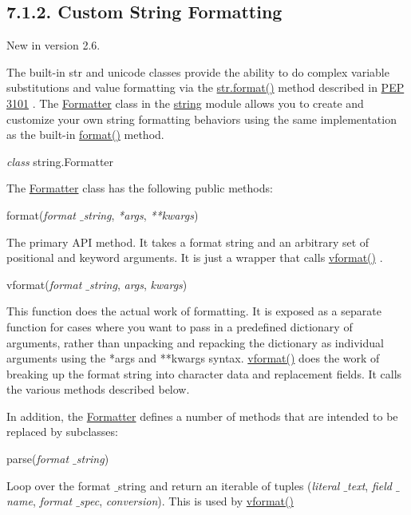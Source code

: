 \documentclass[a4paper,12pt]{report}
\begin{document}
\subsection*{7.1.2. Custom String Formatting}
 \par
\noindent 
New in version 2.6. \par
\noindent 
The built-in str and unicode classes provide the ability to do complex variable substitutions and value formatting via the \href{https://docs.python.org/2/library/stdtypes.html}{str.format()}
 method described in \href{https://www.python.org/dev/peps/pep-3101}{PEP 3101}
. The \href{https://docs.python.org/2/library/string.html}{Formatter}
 class in the \href{https://docs.python.org/2/library/string.html}{string}
 module allows you to create and customize your own string formatting behaviors using the same implementation as the built-in \href{https://docs.python.org/2/library/stdtypes.html}{format()}
 method. \par
\noindent 
\emph{class }string.Formatter \par
The \href{https://docs.python.org/2/library/string.html}{Formatter}
 class has the following public methods: \par
format(\emph{format $  \_  $string}, \emph{*args}, \emph{**kwargs}) \par
The primary API method. It takes a format string and an arbitrary set of positional and keyword arguments. It is just a wrapper that calls \href{https://docs.python.org/2/library/string.html}{vformat()}
. \par
vformat(\emph{format $  \_  $string}, \emph{args}, \emph{kwargs}) \par
This function does the actual work of formatting. It is exposed as a separate function for cases where you want to pass in a predefined dictionary of arguments, rather than unpacking and repacking the dictionary as individual arguments using the *args and **kwargs syntax. \href{https://docs.python.org/2/library/string.html}{vformat()}
 does the work of breaking up the format string into character data and replacement fields. It calls the various methods described below. \par
In addition, the \href{https://docs.python.org/2/library/string.html}{Formatter}
 defines a number of methods that are intended to be replaced by subclasses: \par
parse(\emph{format $  \_  $string}) \par
Loop over the format $  \_  $string and return an iterable of tuples (\emph{literal $  \_  $text}, \emph{field $  \_  $name}, \emph{format $  \_  $spec}, \emph{conversion}). This is used by \href{https://docs.python.org/2/library/string.html}{vformat()}
\end{document}

